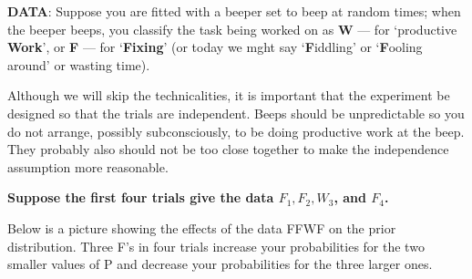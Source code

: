 \documentclass[]{book}
\begin{document}
\textbf{DATA}: Suppose you are fitted with a beeper set to beep at random times; when the beeper beeps, you classify the task being worked on as \textbf{W} --- for `productive \textbf{Work}', or \textbf{F} --- for `\textbf{Fixing}' (or today we mght say `\textbf{F}iddling' or `\textbf{F}ooling around' or wasting time).

Although we will skip the technicalities, it is important that the experiment be designed so that the trials are independent. Beeps should be unpredictable so you do not arrange, possibly subconsciously, to be doing productive work at the beep. They probably also should not be too close together to make the independence assumption more reasonable.

\textbf{Suppose the first four trials give the data \(F_1, F_2, W_3\), and \(F_4\).}

Below is a picture showing the effects of the data FFWF on the prior distribution. Three F's in four trials increase your probabilities for the two smaller values of P and decrease your probabilities for the three larger ones.
\end{document}
